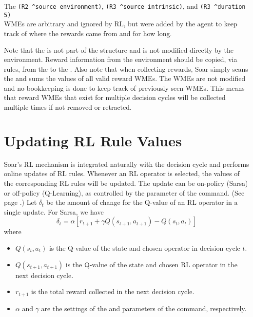 The \verb=(R2 ^source environment)=, \verb=(R3 ^source intrinsic)=, and \verb=(R3 ^duration 5)= \\
WMEs are arbitrary and ignored by RL, but were added by the agent to keep
track of where the rewards came from and for how long.

Note that the  is not part of the  structure and is not modified directly by the environment.
Reward information from the environment should be copied, via rules, from the  to the .
Also note that when collecting rewards, Soar simply scans the  and sums the values of all valid reward WMEs.
The WMEs are not modified and no bookkeeping is done to keep track of previously seen WMEs.
This means that reward WMEs that exist for multiple decision cycles will be collected multiple times if not removed or retracted.

\section{Updating RL Rule Values}
\label{RL-algo}

Soar's RL mechanism is integrated naturally with the decision cycle and performs online updates of RL rules.
Whenever an RL operator is selected, the values of the corresponding RL rules will be updated.
The update can be on-policy (Sarsa) or off-policy (Q-Learning), as controlled by the  parameter of the  command. (See page \pageref{rl}.)
Let $\delta_t$ be the amount of change for the Q-value of an RL operator in a single update.
For Sarsa, we have
$$ \delta_t = \alpha \left[ r_{t+1} + \gamma Q(s_{t+1}, a_{t+1}) - Q(s_t, a_t) \right] $$
where
\begin{itemize}
	\item $Q(s_t, a_t)$ is the Q-value of the state and chosen operator in decision cycle $t$.
	\item $Q(s_{t+1}, a_{t+1})$ is the Q-value of the state and chosen RL operator in the next decision cycle.
	\item $r_{t+1}$ is the total reward collected in the next decision cycle.
	\item $\alpha$ and $\gamma$ are the settings of the  and  parameters of the  command, respectively.
\end{itemize}

